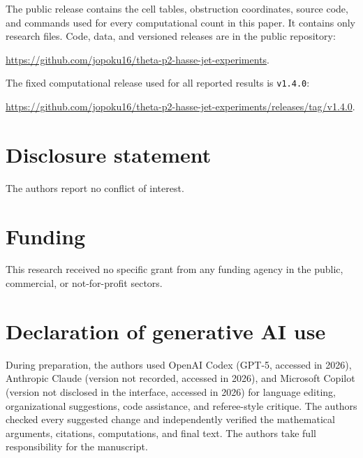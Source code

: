 \documentclass[11pt]{article}
\theoremstyle{remark}
\begin{document}
The public release contains the cell tables, obstruction coordinates,
source code, and commands used for every computational count in this paper.
It contains only research files.  Code, data, and versioned releases are in
the public repository:
\begin{center}
\url{https://github.com/jopoku16/theta-p2-hasse-jet-experiments}.
\end{center}
The fixed computational release used for all reported results is
\texttt{v1.4.0}:
\begin{center}
\url{https://github.com/jopoku16/theta-p2-hasse-jet-experiments/releases/tag/v1.4.0}.
\end{center}

\section*{Disclosure statement}

The authors report no conflict of interest.

\section*{Funding}

This research received no specific grant from any funding agency in the
public, commercial, or not-for-profit sectors.

\section*{Declaration of generative AI use}

During preparation, the authors used OpenAI Codex (GPT-5, accessed in 2026),
Anthropic Claude (version not recorded, accessed in 2026), and Microsoft
Copilot (version not disclosed in the interface, accessed in 2026) for
language editing, organizational suggestions, code assistance, and
referee-style critique.  The authors checked every suggested change and
independently verified the mathematical arguments, citations, computations,
and final text.  The authors take full responsibility for the manuscript.
\end{document}
